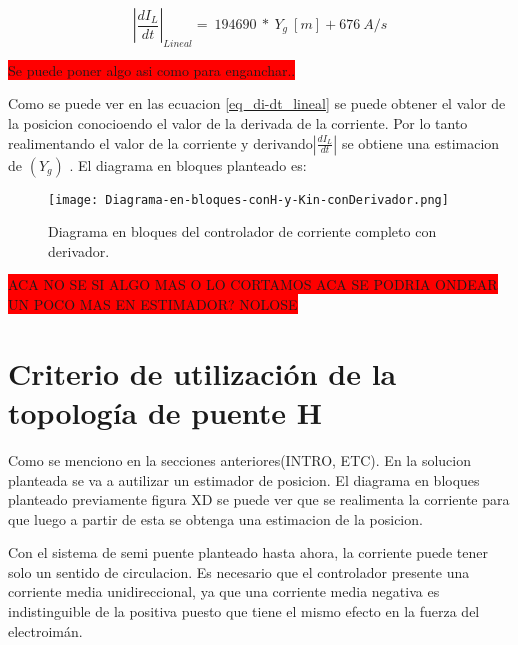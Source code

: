 \begin{equation} \label{eq_di-dt_lineal}
{\left|\frac{{dI}_L}{dt}\right|}_{Lineal}=\ 194690\ *\ Y_g\:[m]+676\:A/s
\end{equation}

\colorbox{red}{Se puede poner algo asi como para enganchar..}

Como se puede ver en las ecuacion \ref{eq_di-dt_lineal} se puede obtener el valor de la posicion conocioendo el valor de la derivada de la corriente. Por lo tanto realimentando el valor de la corriente y derivando$\left|\frac{{dI}_L}{dt}\right|$ se obtiene una estimacion de $(Y_g)$ . El diagrama en bloques planteado es:

\begin{figure}[H]
	\centering
	\texttt{[image: Diagrama-en-bloques-conH-y-Kin-conDerivador.png]}
	\caption{Diagrama en bloques del controlador de corriente completo con derivador.}
	\label{fig:img_diag-en-bloques-conH-y-Kin-con-Derivador}
\end{figure}


\colorbox{red}{ACA NO SE SI ALGO MAS O LO CORTAMOS ACA SE PODRIA ONDEAR UN POCO MAS EN ESTIMADOR? NOLOSE}

\section{Criterio de utilización de la topología de puente H}
\label{secc_justificación-puente-H}

Como se menciono en la secciones anteriores(INTRO, ETC). En la solucion planteada se va a autilizar un estimador de posicion. El diagrama en bloques planteado previamente figura XD se puede ver que se realimenta la corriente para que luego a partir de esta se obtenga una estimacion de la posicion.


Con el sistema de semi puente planteado hasta ahora, la corriente puede tener solo un sentido de circulacion. Es necesario que el controlador presente una corriente media unidireccional, ya que una corriente media negativa es indistinguible de la positiva puesto que tiene el mismo efecto en la fuerza del electroimán.%

